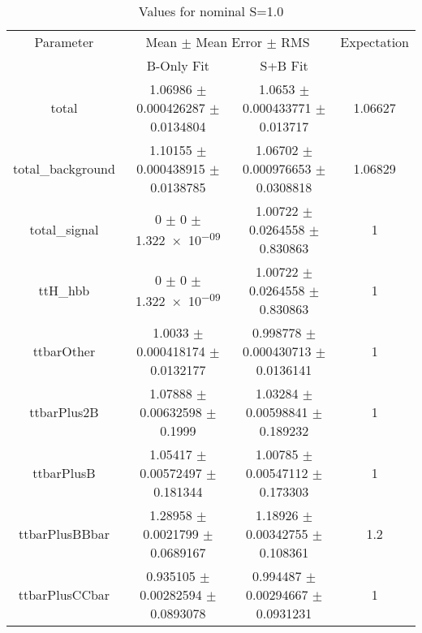 \begin{table}
\centering
\caption{Values for nominal S=1.0}
\begin{tabular}{cccc}
\toprule
Parameter & \multicolumn{2}{c}{Mean $\pm$ Mean Error $\pm$ RMS} & Expectation\\
 & B-Only Fit & S+B Fit & \\
\midrule
total & \num{1.06986} $\pm$ \num{0.000426287} $\pm$ \num{0.0134804} & \num{1.0653} $\pm$ \num{0.000433771} $\pm$ \num{0.013717} & \num{1.06627}\\
total\_background & \num{1.10155} $\pm$ \num{0.000438915} $\pm$ \num{0.0138785} & \num{1.06702} $\pm$ \num{0.000976653} $\pm$ \num{0.0308818} & \num{1.06829}\\
total\_signal & \num{0} $\pm$ \num{0} $\pm$ \num{1.322e-09} & \num{1.00722} $\pm$ \num{0.0264558} $\pm$ \num{0.830863} & \num{1}\\
ttH\_hbb & \num{0} $\pm$ \num{0} $\pm$ \num{1.322e-09} & \num{1.00722} $\pm$ \num{0.0264558} $\pm$ \num{0.830863} & \num{1}\\
ttbarOther & \num{1.0033} $\pm$ \num{0.000418174} $\pm$ \num{0.0132177} & \num{0.998778} $\pm$ \num{0.000430713} $\pm$ \num{0.0136141} & \num{1}\\
ttbarPlus2B & \num{1.07888} $\pm$ \num{0.00632598} $\pm$ \num{0.1999} & \num{1.03284} $\pm$ \num{0.00598841} $\pm$ \num{0.189232} & \num{1}\\
ttbarPlusB & \num{1.05417} $\pm$ \num{0.00572497} $\pm$ \num{0.181344} & \num{1.00785} $\pm$ \num{0.00547112} $\pm$ \num{0.173303} & \num{1}\\
ttbarPlusBBbar & \num{1.28958} $\pm$ \num{0.0021799} $\pm$ \num{0.0689167} & \num{1.18926} $\pm$ \num{0.00342755} $\pm$ \num{0.108361} & \num{1.2}\\
ttbarPlusCCbar & \num{0.935105} $\pm$ \num{0.00282594} $\pm$ \num{0.0893078} & \num{0.994487} $\pm$ \num{0.00294667} $\pm$ \num{0.0931231} & \num{1}\\
\bottomrule
\end{tabular}
\end{table}